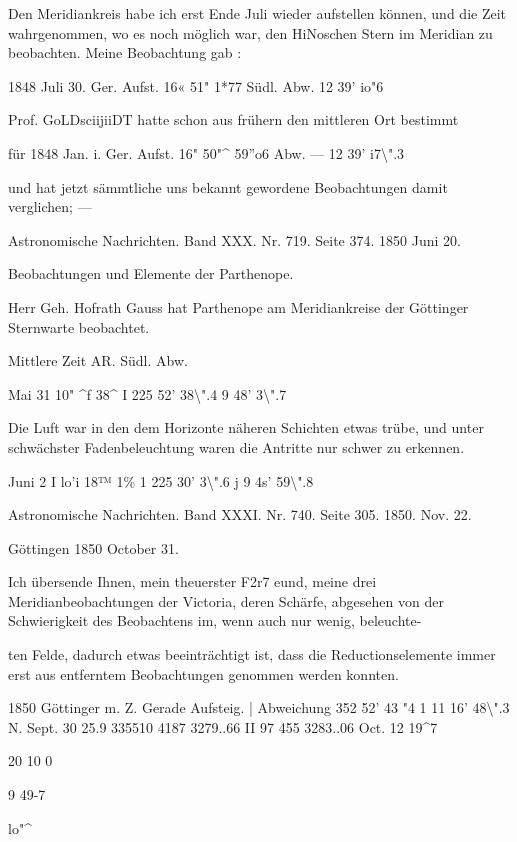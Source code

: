 \documentclass[10pt,a4paper]{article}
\begin{document}
Den Meridiankreis habe ich erst Ende Juli wieder aufstellen können, und die Zeit wahrgenommen, wo es noch möglich war, den HiNoschen Stern im Meridian zu beobachten. Meine Beobachtung gab :

1848 Juli 30. Ger. Aufst. 16« 51" 1*77 Südl. Abw. 12\textdegree{} 39' io"6

Prof. GoLDsciijiiDT hatte schon aus frühern den mittleren Ort bestimmt

für 1848 Jan. i. Ger. Aufst. 16" 50"\textasciicircum{} 59''o6 Abw. — 12\textdegree{} 39' i7\textbackslash{}".3

und hat jetzt sämmtliche uns bekannt gewordene Beobachtungen damit verglichen; —

Astronomische Nachrichten. Band XXX. Nr. 719. Seite 374. 1850 Juni 20.

Beobachtungen und Elemente der Parthenope.

Herr Geh. Hofrath Gauss hat Parthenope am Meridiankreise der Göttinger Sternwarte beobachtet.

Mittlere Zeit AR. Südl. Abw.

Mai 31 10" \textasciicircum{}f 38\textasciicircum{} I 225\textdegree{} 52' 38\textbackslash{}".4 9\textdegree{} 48' 3\textbackslash{}".7

Die Luft war in den dem Horizonte näheren Schichten etwas trübe, und unter schwächster Fadenbeleuchtung waren die Antritte nur schwer zu erkennen.

Juni 2 I lo'i 18™ 1\% 1 225\textdegree{} 30' 3\textbackslash{}".6 j 9\textdegree{} 4s' 59\textbackslash{}".8

Astronomische Nachrichten. Band XXXI. Nr. 740. Seite 305. 1850. Nov. 22.

Göttingen 1850 October 31.

Ich übersende Ihnen, mein theuerster F2r7 eund, meine drei Meridianbeobachtungen der Victoria, deren Schärfe, abgesehen von der Schwierigkeit des Beobachtens im, wenn auch nur wenig, beleuchte-

ten Felde, dadurch etwas beeinträchtigt ist, dass die Reductionselemente immer erst aus entferntem Beobachtungen genommen werden konnten.

1850 Göttinger m. Z. Gerade Aufsteig. | Abweichung 352\textdegree{} 52' 43 "4 1 11\textdegree{} 16' 48\textbackslash{}".3 N. Sept. 30 25.9 335510 4187 3279..66 II 97 455 3283..06 Oct. 12 19\textasciicircum{}7

20 10 0

9 49-7

lo"\textasciicircum{}
\end{document}
